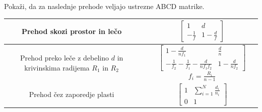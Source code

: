 \begin{definition}
Pokaži, da za naslednje prehode veljajo ustrezne ABCD matrike. \\
\end{definition}
\begin{tabular}{|c|c|c|} \hline  
      Prehod skozi prostor in lečo & \parbox[c]{3cm}{\def\svgwidth{3cm}} & 
      $\begin{bmatrix} 1 & d\\ -\frac{1}{f} & 1-\frac{d}{f} \end{bmatrix}$ \\ \hline
      \parbox[c]{12em}{Prehod preko leče z debelino $d$ 
      in krivinskima radijema $R_1$ in $R_2$}& 
      \parbox[c]{3cm}{\def\svgwidth{3cm}} & 
      $\begin{bmatrix} 1-\frac{d}{nf_{1}} & \frac{d}{n}\\
      -\frac{1}{f_2}- \frac{1}{f_1}-\frac{d}{nf_1f_2}& 1-\frac{d}{nf_{2}} \end{bmatrix}$
      $f_{i}=\frac{R_{i}}{n-1}$\\ \hline
      Prehod čez zaporedje plasti & \parbox[c]{3cm}{\def\svgwidth{3cm}} & 
      $\begin{bmatrix} 1 & \sum_{i=1}^{N}\frac{d_{i}}{n_{i}}\\ 0 & 1 \end{bmatrix}$ \\ \hline 
\end{tabular}
